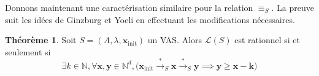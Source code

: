 \documentclass[a4paper,final]{article}
\theoremstyle{definition}
\newtheorem{Theorem}{Théorème}
\let\geq\geqslant
\newcommand{\N}{\ensuremath{\mathbb{N}}}
\newcommand{\lang}{\ensuremath{\mathcal{L}}}
\newcommand{\trans}[2]{\ensuremath{\stackrel{#1}{\longrightarrow}_{#2}}}
\newcommand{\vect}[1]{\ensuremath{\mathbf{#1}}}
\newcommand{\rel}{\ensuremath{\equiv}}
\newcommand{\xinit}{\ensuremath{\vect{x}_\text{init}}}
\begin{document}
\vspace{5mm}

Donnons maintenant une caractérisation similaire pour la relation $\rel_S$.
La preuve suit les idées de Ginzburg et Yoeli \cite{giyo80} en effectuant les modifications nécessaires.

\begin{Theorem}\label{caractérisation}
    Soit $S=(A,\lambda,\xinit)$ un VAS.
    Alors $\lang(S)$ est rationnel si et seulement si
    \begin{equation}
        \exists k\in\N, \forall \vect{x},\vect{y}\in\N^d, 
\big( \xinit\trans{*}{S} \vect{x} \trans{*}{S} \vect{y}\implies
\vect{y}\geq \vect{x} -\vect{k} \big)
    \label{eq:caracterisation}
    \end{equation}
\end{Theorem}
\end{document}
